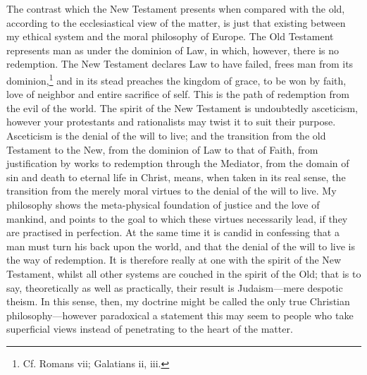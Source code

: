 The contrast which the New Testament presents when compared with the
old, according to the ecclesiastical view of the matter, is just that
existing between my ethical system and the moral philosophy of Europe.
The Old Testament represents man as under the dominion of Law, in
which, however, there is no redemption. The New Testament declares Law
to have failed, frees man from its dominion,\footnote{Cf. Romans vii;
Galatians ii, iii.} and in its stead preaches the kingdom of grace, to
be won by faith, love of neighbor and entire sacrifice of self. This
is the path of redemption from the evil of the world. The spirit of
the New Testament is undoubtedly asceticism, however your protestants
and rationalists may twist it to suit their purpose. Asceticism is the
denial of the will to live; and the transition from the old Testament
to the New, from the dominion of Law to that of Faith, from
justification by works to redemption through the Mediator, from the
domain of sin and death to eternal life in Christ, means, when taken
in its real sense, the transition from the merely moral virtues to the
denial of the will to live. My philosophy shows the
meta-physical foundation of justice and the love of mankind,
and points to the goal to which these virtues necessarily lead, if
they are practised in perfection. At the same time it is candid in
confessing that a man must turn his back upon the world, and that the
denial of the will to live is the way of redemption. It is therefore
really at one with the spirit of the New Testament, whilst all other
systems are couched in the spirit of the Old; that is to say,
theoretically as well as practically, their result is Judaism---mere
despotic theism. In this sense, then, my doctrine might be called the
only true Christian philosophy---however paradoxical a statement this
may seem to people who take superficial views instead of penetrating
to the heart of the matter.

